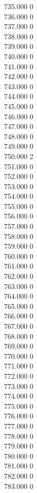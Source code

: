 { 735.000	0 \\
 736.000	0 \\
 737.000	0 \\
 738.000	0 \\
 739.000	0 \\
 740.000	0 \\
 741.000	0 \\
 742.000	0 \\
 743.000	0 \\
 744.000	0 \\
 745.000	0 \\
 746.000	0 \\
 747.000	0 \\
 748.000	0 \\
 749.000	0 \\
 750.000	2 \\
 751.000	0 \\
 752.000	0 \\
 753.000	0 \\
 754.000	0 \\
 755.000	0 \\
 756.000	0 \\
 757.000	0 \\
 758.000	0 \\
 759.000	0 \\
 760.000	0 \\
 761.000	0 \\
 762.000	0 \\
 763.000	0 \\
 764.000	0 \\
 765.000	0 \\
 766.000	0 \\
 767.000	0 \\
 768.000	0 \\
 769.000	0 \\
 770.000	0 \\
 771.000	0 \\
 772.000	0 \\
 773.000	0 \\
 774.000	0 \\
 775.000	0 \\
 776.000	0 \\
 777.000	0 \\
 778.000	0 \\
 779.000	0 \\
 780.000	0 \\
 781.000	0 \\
 782.000	0 \\
 783.000	0 \\
}
